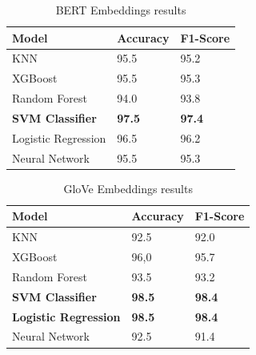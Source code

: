 \begin{table}[hbt!]
\begin{threeparttable}
\caption{BERT Embeddings results}
\label{bert_embeddings_results}
\begin{tabular}{lll}
\toprule
\headrow Model & Accuracy & F1-Score\\
\midrule
 KNN                &       95.5 &       95.2 \\
 XGBoost            &       95.5 &       95.3 \\
 Random Forest       &       94.0   &       93.8 \\
 \textbf{SVM Classifier}                &       \textbf{97.5} &       \textbf{97.4} \\
 Logistic Regression                 &       96.5 &       96.2 \\
 Neural Network      &       95.5 &       95.3 \\
\bottomrule
\end{tabular}
\end{threeparttable}
\end{table}

\begin{table}[hbt!]
\begin{threeparttable}
\caption{GloVe Embeddings results}
\label{glove_embeddings_results}
\begin{tabular}{lll}
\toprule
\headrow Model & Accuracy & F1-Score\\
\midrule
 KNN               &       92.5 &       92.0   \\
 XGBoost           &       96,0   &       95.7 \\
 Random Forest      &       93.5 &       93.2 \\
 \textbf{SVM Classifier}               &       \textbf{98.5} &       \textbf{98.4} \\
 \textbf{Logistic Regression}                &       \textbf{98.5} &       \textbf{98.4} \\
 Neural Network     &       92.5 &       91.4 \\
\bottomrule
\end{tabular}
\end{threeparttable}
\end{table}

